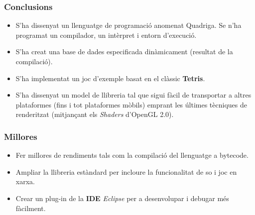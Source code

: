 \documentclass[serif,9pt]{beamer}
\begin{document}
  \begin{frame}\frametitle{Conclusions}
    \begin{itemize}
      \item S'ha dissenyat un llenguatge de programació anomenat Quadriga. Se n'ha programat un compilador, un intèrpret i entorn d'execució. \bigskip
      \item S'ha creat una base de dades especificada dinàmicament (resultat de la compilació). \bigskip
      \item S'ha implementat un joc d'exemple basat en el clàssic {\bf Tetris}. \bigskip
      \item S'ha dissenyat un model de llibreria tal que sigui fàcil de transportar a altres plataformes (fins i tot plataformes mòbils) emprant les últimes tècniques de renderitzat (mitjançant els {\em Shaders} d'OpenGL 2.0).
    \end{itemize}
  \end{frame}
  
  \begin{frame}\frametitle{Millores}
    \begin{itemize}
      \item Fer millores de rendiments tals com la compilació del llenguatge a bytecode. \bigskip
      \item Ampliar la llibreria estàndard per incloure la funcionalitat de so i joc en xarxa. \bigskip
      \item Crear un plug-in de la {\bf IDE} {\em Eclipse} per a desenvolupar i debugar més fàcilment.
    \end{itemize}
  \end{frame}

\begin{frame}
\frametitle{}
\titlepage
\end{frame}
\end{document}
